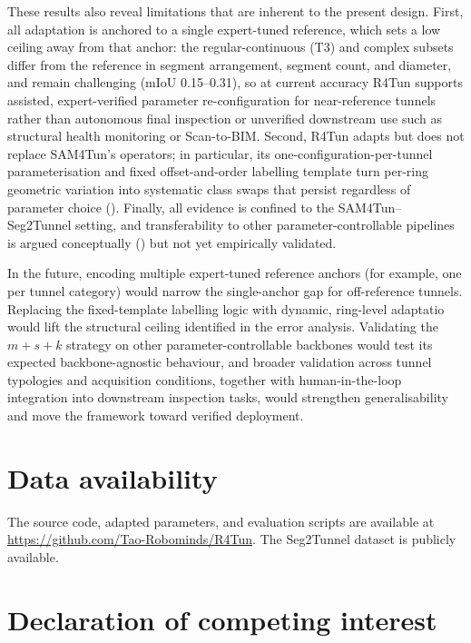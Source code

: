 \documentclass[a4paper,fleqn]{cas-dc}
\begin{document}
{These results also reveal limitations that are inherent to the present design. First, all adaptation is anchored to a single expert-tuned reference, which sets a low ceiling away from that anchor: the regular-continuous (T3) and complex subsets differ from the reference in segment arrangement, segment count, and diameter, and remain challenging (mIoU 0.15--0.31), so at current accuracy R4Tun supports assisted, expert-verified parameter re-configuration for near-reference tunnels rather than autonomous final inspection or unverified downstream use such as structural health monitoring or Scan-to-BIM. Second, R4Tun adapts but does not replace SAM4Tun's operators; in particular, its one-configuration-per-tunnel parameterisation and fixed offset-and-order labelling template turn per-ring geometric variation into systematic class swaps that persist regardless of parameter choice (). Finally, all evidence is confined to the SAM4Tun--Seg2Tunnel setting, and transferability to other parameter-controllable pipelines is argued conceptually () but not yet empirically validated.

In the future, encoding multiple expert-tuned reference anchors (for example, one per tunnel category) would narrow the single-anchor gap for off-reference tunnels. Replacing the fixed-template labelling logic with dynamic, ring-level adaptatio would lift the structural ceiling identified in the error analysis. Validating the \mbox{$m+s+k$} strategy on other parameter-controllable backbones would test its expected backbone-agnostic behaviour, and broader validation across tunnel typologies and acquisition conditions, together with human-in-the-loop integration into downstream inspection tasks, would strengthen generalisability and move the framework toward verified deployment.


\section*{Data availability}

The source code, adapted parameters, and evaluation scripts are available at \url{https://github.com/Tao-Robominds/R4Tun}. The Seg2Tunnel dataset is publicly available.

\section*{Declaration of competing interest}

}
\end{document}
